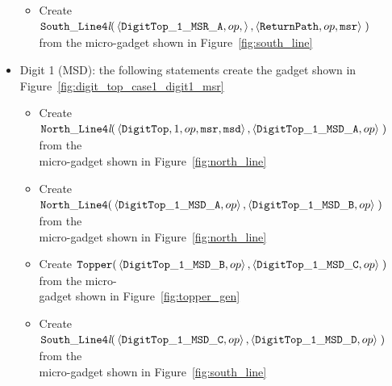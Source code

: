 \begin{itemize}
\begin{itemize}
            \item Create
            $\begin{aligned}[t]
                {\tt South\_Line4\textit{l}}(& \left\langle {\tt DigitTop\_1\_MSR\_A},  op, \right\rangle,
                                               \left\langle {\tt ReturnPath}, op, {\tt msr}  \right\rangle \;)
            \end{aligned}$ \\ from the micro-gadget shown in Figure~\ref{fig:south_line}
        \end{itemize}
        \vspace{1cm}


        \item Digit 1 (MSD): the following statements create the gadget shown in Figure~\ref{fig:digit_top_case1_digit1_msr}
        \begin{itemize}
            \item Create
            $\begin{aligned}[t]
                {\tt North\_Line4\textit{l}}(& \left\langle {\tt DigitTop}, 1,          op, {\tt msr}, {\tt msd} \right\rangle,
                                               \left\langle {\tt DigitTop\_1\_MSD\_A},  op  \right\rangle \;)
            \end{aligned}$ from the\\micro-gadget shown in Figure~\ref{fig:north_line}

            \item Create $\begin{aligned}[t]
                {\tt North\_Line4}(& \left\langle {\tt DigitTop\_1\_MSD\_A},  op \right\rangle,
                                     \left\langle {\tt DigitTop\_1\_MSD\_B},  op  \right\rangle \;)
            \end{aligned}$ from the\\micro-gadget shown in Figure~\ref{fig:north_line}

            \item Create $\begin{aligned}[t]
                {\tt Topper}(& \left\langle {\tt DigitTop\_1\_MSD\_B},  op \right\rangle,
                               \left\langle {\tt DigitTop\_1\_MSD\_C},  op  \right\rangle \;)
            \end{aligned}$ from the micro-\\gadget shown in Figure~\ref{fig:topper_gen}

            \item Create
            $\begin{aligned}[t]
                {\tt South\_Line4\textit{l}}(& \left\langle {\tt DigitTop\_1\_MSD\_C}, op \right\rangle,
                                               \left\langle {\tt DigitTop\_1\_MSD\_D}, op \right\rangle \;)
            \end{aligned}$ from the\\ micro-gadget shown in Figure~\ref{fig:south_line}


\end{itemize}
\end{itemize}
